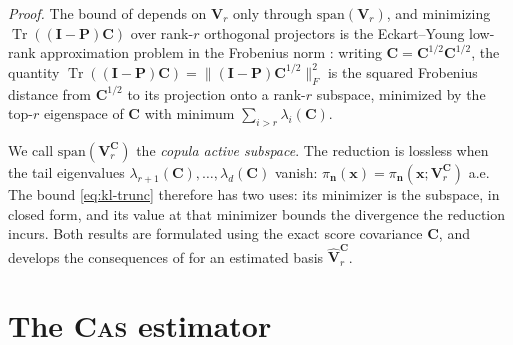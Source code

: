 \documentclass[review,hidelinks,onefignum,onetabnum]{siamart251216}
\newcommand{\tr}{\operatorname{Tr}}
\newcommand{\mC}{\bm{C}}
\newcommand{\mV}{\bm{V}}
\newcommand{\hmV}{\widehat{\bm{V}}}
\newcommand{\mP}{\bm{P}}
\newcommand{\mI}{\bm{I}}
\newcommand{\vn}{\bm{n}}
\newcommand{\vx}{\bm{x}}
\begin{document}
\emph{Proof.} The bound of  depends on $\mV_r$ only through $\mathrm{span}(\mV_r)$, and minimizing $\tr((\mI-\mP)\mC)$ over rank-$r$ orthogonal projectors is the Eckart--Young low-rank approximation problem in the Frobenius norm \cite{EckartYoung1936}: writing $\mC = \mC^{1/2}\mC^{1/2}$, the quantity $\tr((\mI-\mP)\mC) = \|(\mI-\mP)\mC^{1/2}\|_F^2$ is the squared Frobenius distance from $\mC^{1/2}$ to its projection onto a rank-$r$ subspace, minimized by the top-$r$ eigenspace of $\mC$ with minimum $\sum_{i>r}\lambda_i(\mC)$.

We call $\mathrm{span}(\mV_r^{\mC})$ the \emph{copula active subspace}. The reduction is lossless when the tail eigenvalues $\lambda_{r+1}(\mC),\ldots,\lambda_d(\mC)$ vanish: $\pi_{\vn}(\vx) = \pi_{\vn}(\vx;\mV_r^{\mC})$ a.e. The bound \eqref{eq:kl-trunc} therefore has two uses: its minimizer is the subspace, in closed form, and its value at that minimizer bounds the divergence the reduction incurs. Both results are formulated using the exact score covariance $\mC$, and  develops the consequences of  for an estimated basis $\hmV_r^{\mC}$.

\section{The \textsc{Cas} estimator}
\label{sec:estimator}
\end{document}
